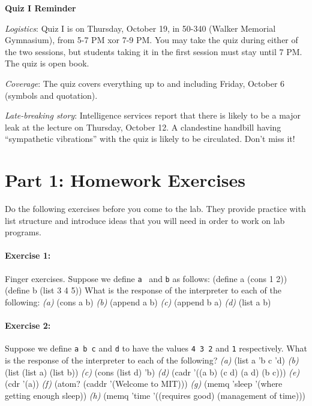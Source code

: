 \mbox{}\hrulefill\mbox{}

\begin{center}
{\bf Quiz I Reminder}
\end{center}

{\em Logistics\/}:  Quiz I is on Thursday, October 19, in 50-340 (Walker
Memorial Gymnasium), from 5-7 PM xor 7-9 PM.  You may take the quiz during
either of the two sessions, but students taking it in the first session must
stay until 7 PM.  The quiz is open book.

{\em Coverage\/}: The quiz covers everything up to and including
Friday, October 6 (symbols and quotation).

{\em Late-breaking story\/}:  Intelligence services report that there is
likely to be a major leak at the lecture on Thursday, October 12.  A
clandestine handbill having ``sympathetic vibrations'' with the quiz is
likely to be circulated.  Don't miss it!

\mbox{}\hrulefill\mbox{}

\vspace{1cm}

\section{Part 1: Homework Exercises}

Do the following exercises before you come to the lab.  They provide practice
with list structure and introduce ideas that you will need in order to work
on lab programs.


\paragraph{Exercise 1:}

Finger exercises.  Suppose we define {\tt a } and {\tt b} as follows:
 \beginlisp
(define a (cons 1 2))
(define b (list 3 4 5))
 \endlisp
What is the response of the interpreter to each of the following:
\beginlisp
{\it (a)\/}    (cons a b)
{\it (b)\/}    (append a b)
{\it (c)\/}    (append b a)
{\it (d)\/}    (list a b)
\endlisp

\paragraph{Exercise 2:}

Suppose we define {\tt a b c} and {\tt d} to have the values {\tt 4 3 2} and
{\tt 1} respectively.  What is the response of the interpreter to each of the
following?
 \beginlisp
{\it (a)\/}    (list a 'b c 'd)
{\it (b)\/}    (list (list a) (list b))
{\it (c)\/}    (cons (list d) 'b)
{\it (d)\/}    (cadr '((a b) (c d) (a d) (b c)))
{\it (e)\/}    (cdr '(a))
{\it (f)\/}    (atom? (caddr '(Welcome to MIT)))
{\it (g)\/}    (memq 'sleep '(where getting enough sleep))
{\it (h)\/}    (memq 'time '((requires good) (management of time)))
 \endlisp


